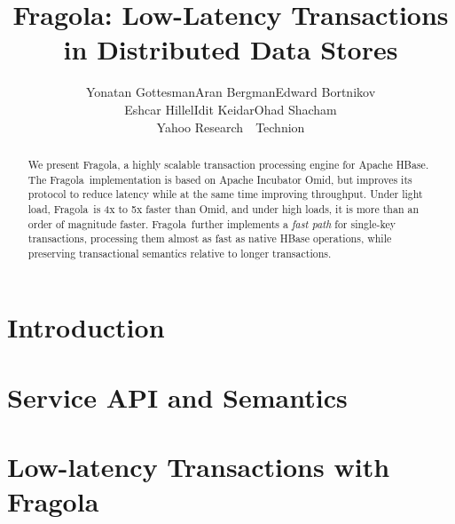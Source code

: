 \documentclass[letterpaper,twocolumn,10pt]{article}
\newcommand{\tb}{\hspace{5mm}}
\newcommand{\sys}{Fragola}
\begin{document}
\date{}

\title{\Large \bf\sys: Low-Latency Transactions in Distributed Data Stores}

\author{
{\rm Yonatan Gottesman\footnotemark[1]\tb Aran Bergman\footnotemark[2]\tb   Edward Bortnikov\footnotemark[1] }\\ 
{\rm Eshcar Hillel\footnotemark[1]\tb Idit Keidar\footnotemark[1] \footnotemark[2]\tb Ohad Shacham\footnotemark[1]}\\
	\footnotemark[1] Yahoo Research\ \ \footnotemark[2] Technion
} %


\maketitle




\begin{abstract}
We present \sys, a highly scalable transaction processing engine 
for Apache HBase. 
The \sys\ implementation is based on Apache Incubator Omid, but 
improves its protocol to reduce latency 
while at the same time improving throughput.
Under light load, \sys\ is 4x to 5x faster than Omid, and under high loads, it is 
more than an order of magnitude faster. 
 \sys\ further implements a \emph{fast path} for single-key transactions,
processing them almost as fast as native HBase operations, while preserving
transactional semantics relative to longer transactions.

\end{abstract}


\section{Introduction} \label{sec:intro}
 

\section{Service API and Semantics} \label{sec:api}


\section{Low-latency Transactions with \sys} \label{sec:ll}


\end{document}
